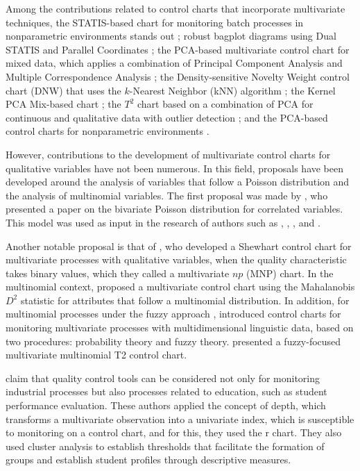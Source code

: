 \documentclass[mathematics,article,submit,moreauthors,pdftex]{mdpi}
\begin{document}
Among the contributions related to control charts that incorporate
multivariate techniques, the STATIS-based chart for monitoring batch
processes in nonparametric environments stands out
\citep{filho2016multivariate}; robust bagplot diagrams using Dual STATIS
and Parallel Coordinates \citep{RamosBarberan2018}; the PCA-based
multivariate control chart for mixed data, which applies a combination
of Principal Component Analysis and Multiple Correspondence Analysis
\citep{Muhammad2018}; the Density-sensitive Novelty Weight control chart
(DNW) that uses the \(k\)-Nearest Neighbor (kNN) algorithm
\citep{liu2020}; the Kernel PCA Mix-based chart
\citep{Ahsan2020, Ahsan2022}; the \(T^2\) chart based on a combination
of PCA for continuous and qualitative data with outlier detection
\citep{Ahsan2021}; and the PCA-based control charts for nonparametric
environments \citep{Farokhnia, liu2020nonparametric}.

However, contributions to the development of multivariate control charts
for qualitative variables have not been numerous. In this field,
proposals have been developed around the analysis of variables that
follow a Poisson distribution and the analysis of multinomial variables.
The first proposal was made by \citet{holgate1964}, who presented a
paper on the bivariate Poisson distribution for correlated variables.
This model was used as input in the research of authors such as
\citet{chiu2007}, \citet{ho2009}, \citet{laungrungrong2011ewma}, and
\citet{epprecht2013optimal}.

Another notable proposal is that of \citet{lu1998control}, who developed
a Shewhart control chart for multivariate processes with qualitative
variables, when the quality characteristic takes binary values, which
they called a multivariate \(np\) (MNP) chart. In the multinomial
context, \citet{ranjan2008multivariate} proposed a multivariate control
chart using the Mahalanobis \(D^2\) statistic for attributes that follow
a multinomial distribution. In addition, for multinomial processes under
the fuzzy approach \citep{taleb2006multivariate},
\citet{taleb2009control} introduced control charts for monitoring
multivariate processes with multidimensional linguistic data, based on
two procedures: probability theory and fuzzy theory.
\citet{pastuizaca2015multivariate} presented a fuzzy-focused
multivariate multinomial T2 control chart.

\citet{Saltos2020} claim that quality control tools can be considered
not only for monitoring industrial processes but also processes related
to education, such as student performance evaluation. These authors
applied the concept of depth, which transforms a multivariate
observation into a univariate index, which is susceptible to monitoring
on a control chart, and for this, they used the r chart. They also used
cluster analysis to establish thresholds that facilitate the formation
of groups and establish student profiles through descriptive measures.
\end{document}
